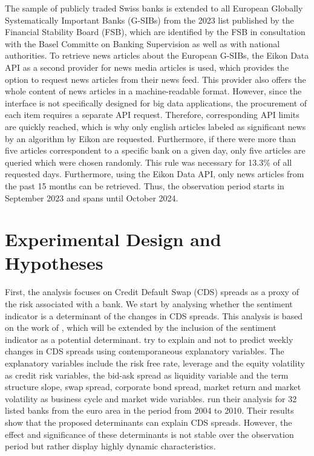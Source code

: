 The sample of publicly traded Swiss banks is extended to all European Globally Systematically Important Banks (G-SIBs) from the 2023 list published by the Financial Stability Board (FSB), which are identified by the FSB in consultation with the Basel Committe on Banking Supervision as well as with national authorities. To retrieve news articles about the European G-SIBs, the Eikon Data API as a second provider for news media articles is used, which provides the option to request news articles from their news feed. This provider also offers the whole content of news articles in a machine-readable format. However, since the interface is not specifically designed for big data applications, the procurement of each item requires a separate API request. Therefore, corresponding API limits are quickly reached, which is why only english articles labeled as significant news by an algorithm by Eikon are requested. Furthermore, if there were more than five articles correspondent to a specific bank on a given day, only five articles are queried which were chosen randomly. This rule was necessary for 13.3\% of all requested days. Furthermore, using the Eikon Data API, only news articles from the past 15 months can be retrieved. Thus, the observation period starts in September 2023 and spans until October 2024.

\section{Experimental Design and Hypotheses} \label{sec:hypotheses}

First, the analysis focuses on Credit Default Swap (CDS) spreads as a proxy of the risk associated with a bank. We start by analysing whether the sentiment indicator is a determinant of the changes in CDS spreads. This analysis is based on the work of \cite{annaert2013}, which will be extended by the inclusion of the sentiment indicator as a potential determinant. \cite{annaert2013} try to explain and not to predict weekly changes in CDS spreads using contemporaneous explanatory variables. The explanatory variables include the risk free rate, leverage and the equity volatility as credit risk variables, the bid-ask spread as liquidity variable and the term structure slope, swap spread, corporate bond spread, market return and market volatility as business cycle and market wide variables. %
\cite{annaert2013} run their analysis for 32 listed banks from the euro area in the period from 2004 to 2010. Their results show that the proposed determinants can explain CDS spreads. However, the effect and significance of these determinants is not stable over the observation period but rather display highly dynamic characteristics. \\		

